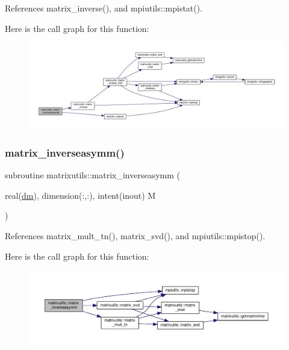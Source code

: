 References matrix\+\_\+inverse(), and mpiutils\+::mpistat().

Here is the call graph for this function\+:
\nopagebreak
\begin{figure}[H]
\begin{center}
\leavevmode
\includegraphics[width=350pt]{namespacematrixutils_ae6aceb4eee59e9d9300a4d7139011aac_cgraph}
\end{center}
\end{figure}
\mbox{\label{namespacematrixutils_af319573ea9284b8ab1e745f9610b36f6}} 
\subsubsection{\texorpdfstring{matrix\+\_\+inverseasymm()}{matrix\_inverseasymm()}}
{\footnotesize\ttfamily subroutine matrixutils\+::matrix\+\_\+inverseasymm (\begin{DoxyParamCaption}\item[{real(\mbox{\hyperlink{namespacematrixutils_a7bdc564986ea4d90f51201c75606ef3d}{dm}}), dimension(\+:,\+:), intent(inout)}]{M }\end{DoxyParamCaption})}



References matrix\+\_\+mult\+\_\+tn(), matrix\+\_\+svd(), and mpiutils\+::mpistop().

Here is the call graph for this function\+:
\nopagebreak
\begin{figure}[H]
\begin{center}
\leavevmode
\includegraphics[width=350pt]{namespacematrixutils_af319573ea9284b8ab1e745f9610b36f6_cgraph}
\end{center}
\end{figure}
\mbox{\label{namespacematrixutils_aa6a8ab9e79a8dd522f5375ebf4a50372}} 
